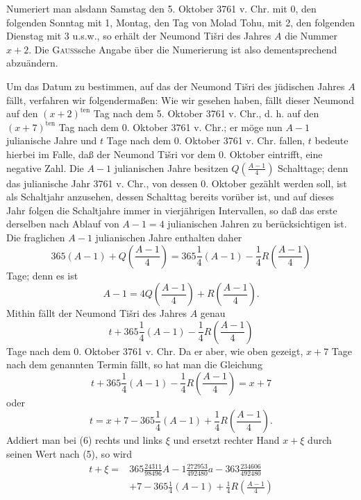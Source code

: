 Numeriert man alsdann Samstag den 5. Oktober 3761 v. Chr. mit 0, den folgenden Sonntag mit 1, Montag, den Tag von Molad Tohu, mit 2, den folgenden Dienstag mit 3 u.s.w., so erhält der Neumond Tišri des Jahres $A$ die Nummer $x+2$. Die \textsc{Gauss}sche Angabe über die Numerierung ist also dementsprechend abzuändern.

Um das Datum zu bestimmen, auf das der Neumond Tišri des jüdischen Jahres $A$ fällt, verfahren wir folgendermaßen: Wie wir gesehen haben, fällt dieser Neumond auf den $(x+2)^{\mathrm{ten}}$ Tag nach dem 5. Oktober 3761 v. Chr., d. h. auf den $(x+7)^{\mathrm{ten}}$ Tag nach dem 0. Oktober 3761 v. Chr.; er möge nun $A-1$ julianische Jahre und $t$ Tage nach dem 0. Oktober 3761 v. Chr. fallen, $t$ bedeute hierbei im Falle, daß der Neumond Tišri vor dem 0. Oktober eintrifft, eine negative Zahl. Die $A-1$ julianischen Jahre besitzen $Q\left(\frac{A-1}{4}\right)$ Schalttage; denn das julianische Jahr 3761 v. Chr., von dessen 0. Oktober gezählt werden soll, ist als
\clearpage{}
\noindent Schaltjahr anzusehen, dessen Schalttag bereits vorüber ist, und auf dieses Jahr folgen die Schaltjahre immer in vierjährigen Intervallen, so daß das erste derselben nach Ablauf von $A-1=4$ julianischen Jahren zu berücksichtigen ist. Die fraglichen $A-1$ julianischen Jahre enthalten daher
\[
365(A-1)+Q\left(\frac{A-1}{4}\right)=365\frac{1}{4}(A-1)-\frac{1}{4}R\left(\frac{A-1}{4}\right)
\]
\noindent Tage; denn es ist
\[
A-1=4Q\left(\frac{A-1}{4}\right)+R\left(\frac{A-1}{4}\right).
\]
\noindent Mithin fällt der Neumond Tišri des Jahres $A$ genau
\[
t+365\frac{1}{4}(A-1)-\frac{1}{4}R\left(\frac{A-1}{4}\right)
\]
\noindent Tage nach dem 0. Oktober 3761 v. Chr. Da er aber, wie oben gezeigt, $x+7$ Tage nach dem genannten Termin fällt, so hat man die Gleichung
\[
t+365\frac{1}{4}(A-1)-\frac{1}{4}R\left(\frac{A-1}{4}\right)=x+7
\]
\noindent oder
\begin{equation}
t=x+7-365\frac{1}{4}(A-1)+\frac{1}{4}R\left(\frac{A-1}{4}\right).\tag*{(6)}
\end{equation}
\noindent Addiert man bei (6) rechts und links $\xi$ und ersetzt rechter Hand $x+\xi$ durch seinen Wert nach (5), so wird
\begin{equation}
\begin{aligned}
t+\xi={}&365\frac{24311}{98496}A-1\frac{272953}{492480}a-363\frac{234606}{492480}\\
&+7-365\frac{1}{4}(A-1)+\frac{1}{4}R\left(\frac{A-1}{4}\right)
\end{aligned}\tag*{(7)}
\end{equation}
